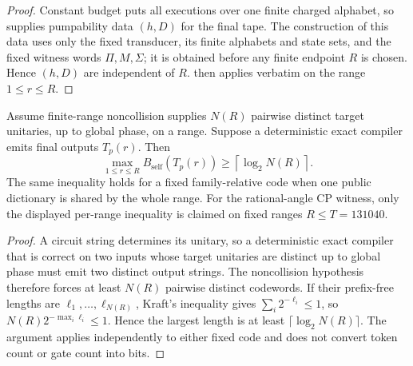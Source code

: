 \begin{proof}
Constant budget puts all executions over one finite charged alphabet, so
 supplies pumpability data $(h,D)$ for the
final tape. The construction of this data uses only the fixed transducer, its
finite alphabets and state sets, and the fixed witness words $\Pi,M,\Sigma$;
it is obtained before any finite endpoint $R$ is chosen. Hence $(h,D)$ are
independent of $R$.  then applies verbatim on
the range $1\le r\le R$.
\end{proof}

\begin{corollary}
\label{app:cor:counting-toll}
Assume finite-range noncollision supplies $N(R)$ pairwise distinct target
unitaries, up to global phase, on a range. Suppose a deterministic exact
compiler emits final outputs $T_p(r)$. Then
\[
  \max_{1\le r\le R}B_{\mathrm{self}}(T_p(r))
  \ge \left\lceil\log_2 N(R)\right\rceil.
\]
The same inequality holds for a fixed family-relative code when one public
dictionary is shared by the whole range.  For the rational-angle CP witness,
only the displayed per-range inequality is claimed on fixed ranges
$R\leq T=131040$.
\end{corollary}

\begin{proof}
A circuit string determines its unitary, so a deterministic exact compiler
that is correct on two inputs whose target unitaries are distinct up to global
phase must emit two distinct output strings. The noncollision hypothesis
therefore forces at least $N(R)$ pairwise distinct codewords.  If their
prefix-free lengths are $\ell_1,\ldots,\ell_{N(R)}$, Kraft's inequality
gives $\sum_i2^{-\ell_i}\leq1$, so
$N(R)2^{-\max_i\ell_i}\leq1$.  Hence the largest length is at least
$\lceil\log_2N(R)\rceil$.  The argument applies independently to either
fixed code and does not convert token count or gate count into bits.
\end{proof}
